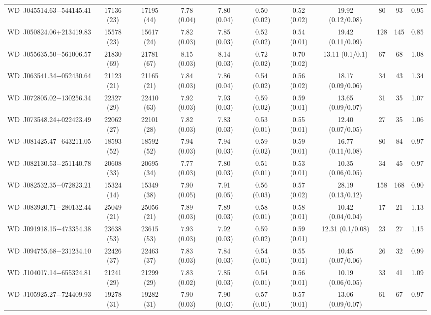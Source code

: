\documentclass[fleqn,usenatbib, useAMS]{mnras}
\begin{document}
\begin{table*}
\begin{tabular}{ccccccccccc}
WD\	J045514.63$-$544145.41	&	17136	(23)	&	17195	(44)	&	7.78	(0.04)	&	7.80	(0.04)	&	0.50	(0.02)	&	0.52	(0.02)	&	19.92	(0.12/0.08)	&	80	&	93	&	0.95	\\
WD\	J050824.06+213419.83	&	15578	(23)	&	15617	(24)	&	7.82	(0.03)	&	7.85	(0.03)	&	0.52	(0.02)	&	0.54	(0.01)	&	19.42	(0.11/0.09)	&	128	&	145	&	0.85	\\
WD\	J055635.50$-$561006.57	&	21830	(69)	&	21781	(67)	&	8.15	(0.03)	&	8.14	(0.03)	&	0.72	(0.02)	&	0.70	(0.02)	&	13.11	(0.1/0.1)	&	67	&	68	&	1.08	\\
WD\	J063541.34$-$052430.64	&	21123	(21)	&	21165	(21)	&	7.84	(0.03)	&	7.86	(0.04)	&	0.54	(0.02)	&	0.56	(0.02)	&	18.17	(0.09/0.06)	&	34	&	43	&	1.34	\\
WD\	J072805.02$-$130256.34	&	22327	(29)	&	22410	(63)	&	7.92	(0.03)	&	7.93	(0.03)	&	0.59	(0.02)	&	0.59	(0.01)	&	13.65	(0.09/0.07)	&	31	&	35	&	1.07	\\
WD\	J073548.24+022423.49	&	22062	(27)	&	22101	(28)	&	7.82	(0.03)	&	7.83	(0.03)	&	0.53	(0.01)	&	0.55	(0.01)	&	12.40	(0.07/0.05)	&	27	&	35	&	1.06	\\
WD\	J081425.47$-$643211.05	&	18593	(52)	&	18592	(52)	&	7.94	(0.03)	&	7.94	(0.03)	&	0.59	(0.02)	&	0.59	(0.01)	&	16.77	(0.11/0.08)	&	80	&	84	&	0.97	\\
WD\	J082130.53$-$251140.78	&	20608	(33)	&	20695	(34)	&	7.77	(0.03)	&	7.80	(0.03)	&	0.51	(0.01)	&	0.53	(0.01)	&	10.35	(0.06/0.05)	&	34	&	45	&	0.97	\\
WD\	J082532.35$-$072823.21	&	15324	(14)	&	15349	(38)	&	7.90	(0.05)	&	7.91	(0.05)	&	0.56	(0.03)	&	0.57	(0.02)	&	28.19	(0.13/0.12)	&	158	&	168	&	0.90	\\
WD\	J083920.71$-$280132.44	&	25049	(21)	&	25056	(21)	&	7.89	(0.03)	&	7.89	(0.03)	&	0.58	(0.01)	&	0.58	(0.01)	&	10.42	(0.04/0.04)	&	17	&	21	&	1.13	\\
WD\	J091918.15$-$473354.38	&	23638	(53)	&	23615	(53)	&	7.93	(0.03)	&	7.92	(0.03)	&	0.59	(0.02)	&	0.59	(0.01)	&	12.31	(0.1/0.08)	&	23	&	27	&	1.15	\\
WD\	J094755.68$-$231234.10	&	22426	(37)	&	22463	(37)	&	7.83	(0.03)	&	7.84	(0.03)	&	0.54	(0.01)	&	0.55	(0.01)	&	10.45	(0.07/0.06)	&	26	&	32	&	0.99	\\
WD\	J104017.14$-$655324.81	&	21241	(29)	&	21299	(29)	&	7.83	(0.02)	&	7.85	(0.03)	&	0.54	(0.01)	&	0.56	(0.01)	&	10.19	(0.06/0.05)	&	33	&	41	&	1.09	\\
WD\	J105925.27$-$724409.93	&	19278	(31)	&	19282	(31)	&	7.90	(0.03)	&	7.90	(0.03)	&	0.57	(0.01)	&	0.57	(0.01)	&	13.06	(0.09/0.07)	&	61	&	67	&	0.97	\\

\end{tabular}
\end{table*}
\end{document}
